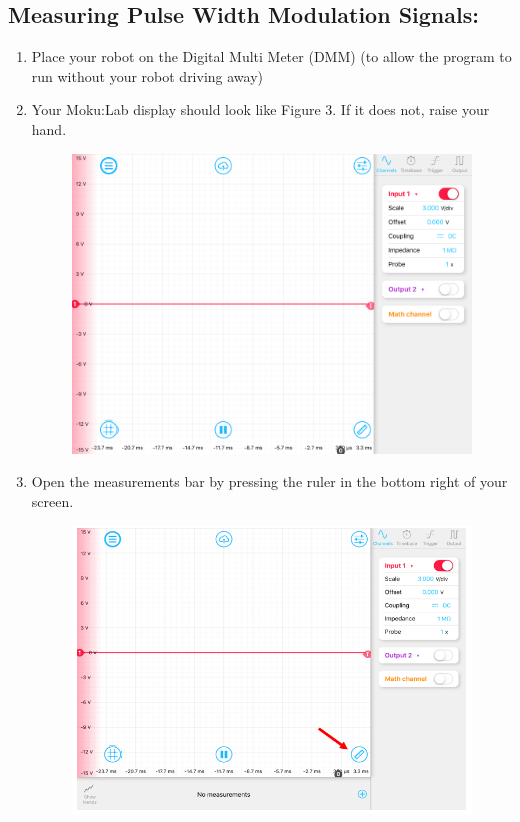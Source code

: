 \documentclass{handout}
\begin{document}
	\subsection{Measuring Pulse Width Modulation Signals:}
	\begin{enumerate}
		\item Place your robot on the Digital Multi Meter (DMM) (to allow the program to run without your robot driving away)
		\item Your Moku:Lab display should look like Figure 3. If it does not, raise your hand.
		\begin{figure} [H]
			\centering
			\includegraphics[width=.75\textwidth]{Figure5.PNG}
			\caption{}
		\end{figure}

	
		\item Open the measurements bar by pressing the ruler in the bottom right of your screen.
		\begin{figure} [H]
			\centering
			\includegraphics[width=.75\textwidth]{Figure6.PNG}
		\end{figure}


\end{enumerate}
\end{document}
